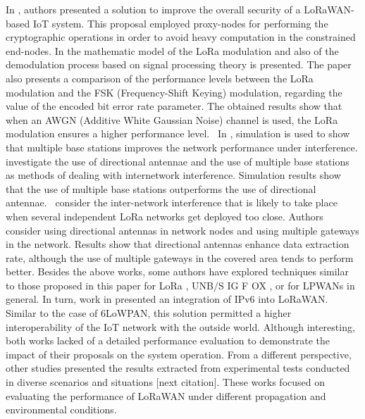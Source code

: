  \cite{naoui_enhancing_2016}   In \cite{naoui_enhancing_2016}, authors presented a solution to improve the overall security of a LoRaWAN-based IoT system. This proposal employed proxy-nodes for performing the cryptographic operations in order to avoid heavy computation in the constrained end-nodes.   \newline 
 \cite{vangelista_frequency_2017}   In \cite{vangelista_frequency_2017} the mathematic model of the LoRa modulation and also of the demodulation process based on signal processing theory is presented. The paper also presents a comparison of the performance levels between the LoRa modulation and the FSK (Frequency-Shift Keying) modulation, regarding the value of the encoded bit error rate parameter. The obtained results show that when an AWGN (Additive White Gaussian Noise) channel is used, the LoRa modulation ensures a higher performance level.~   \newline 
 \cite{voigt_mitigating_2016}   In \cite{voigt_mitigating_2016}, simulation is used to show that multiple base stations improves the network performance under interference.\citet{voigt_mitigating_2016} investigate the use of directional antennae and the use of multiple base stations as methods of dealing with internetwork interference. Simulation results show that the use of multiple base stations outperforms the use of directional antennae.~\citet{voigt_mitigating_2016} consider the inter-network interference that is likely to take place when several independent LoRa networks get deployed too close. Authors consider using directional antennas in network nodes and using multiple gateways in the network. Results show that directional antennas enhance data extraction rate, although the use of multiple gateways in the covered area tends to perform better. Besides the above works, some authors have explored techniques similar to those proposed in this paper for LoRa , UNB/S IG F OX , or for LPWANs in general.   \newline 
 \cite{weber_ipv6_2016}   In turn, work in \cite{weber_ipv6_2016} presented an integration of IPv6 into LoRaWAN. Similar to the case of 6LoWPAN, this solution permitted a higher interoperability of the IoT network with the outside world. Although interesting, both works lacked of a detailed performance evaluation to demonstrate the impact of their proposals on the system operation. From a different perspective, other studies presented the results extracted from experimental tests conducted in diverse scenarios and situations [next citation]. These works focused on evaluating the performance of LoRaWAN under different propagation and environmental conditions.~   \newline 
